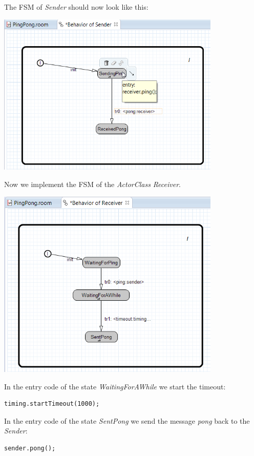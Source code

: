 The FSM of \emph{Sender} should now look like this:

\includegraphics[width=0.8\textwidth]{images/017-11-FSM-Sender.png}

Now we implement the FSM of the \emph{ActorClass} \emph{Receiver}.

\includegraphics[width=0.8\textwidth]{images/017-12-FSM-Receiver.png}

In the entry code of the state \emph{WaitingForAWhile} we start the timeout: 

\begin{verbatim}
timing.startTimeout(1000);
\end{verbatim}

In the entry code of the state \emph{SentPong} we send the message \emph{pong} back to the \emph{Sender}: 

\begin{verbatim}
sender.pong();
\end{verbatim}

